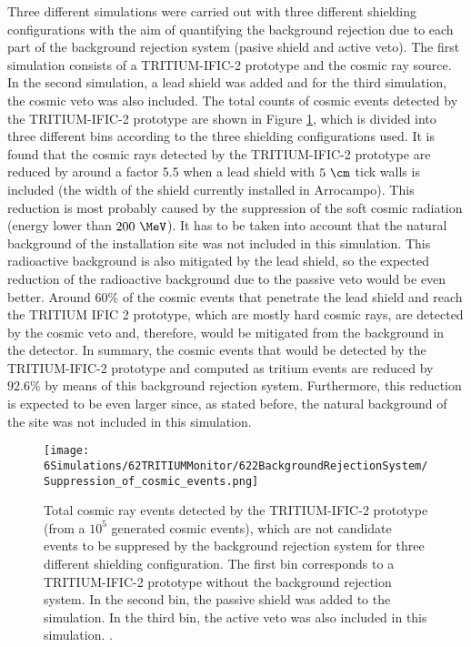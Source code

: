 Three different simulations were carried out with three different shielding configurations with the aim of quantifying the background rejection due to each part of the background rejection system (pasive shield and active veto). The first simulation consists of a TRITIUM-IFIC-2 prototype and the cosmic ray source. In the second simulation, a lead shield was added and for the third simulation, the cosmic veto was also included. The total counts of cosmic events detected by the TRITIUM-IFIC-2 prototype are shown in Figure \ref{fig:CosmicEventsSuppressionSimulated}, which is divided into three different bins according to the three shielding configurations used. It is found that the cosmic rays detected by the TRITIUM-IFIC-2 prototype are reduced by around a factor 5.5 when a lead shield with $5~\cm$ tick walls is included (the width of the shield currently installed in Arrocampo). This reduction is most probably caused by the suppression of the soft cosmic radiation (energy lower than $200~\MeV$). It has to be taken into account that the natural background of the installation site was not included in this simulation. This radioactive background is also mitigated by the lead shield, so the expected reduction of the radioactive background due to the passive veto would be even better. Around $60\%$ of the cosmic events that penetrate the lead shield and reach the TRITIUM IFIC 2 prototype, which are mostly hard cosmic rays, are detected by the cosmic veto and, therefore, would be mitigated from the background in the detector. In summary, the cosmic events that would be detected by the TRITIUM-IFIC-2 prototype and computed as tritium events are reduced by $92.6\%$ by means of this background rejection system. Furthermore, this reduction is expected to be even larger since, as stated before, the natural background of the site was not included in this simulation.

\begin{figure}[h]
\texttt{[image: 6Simulations/62TRITIUMMonitor/622BackgroundRejectionSystem/Suppression\_of\_cosmic\_events.png]}
\centering
\caption{Total cosmic ray events detected by the TRITIUM-IFIC-2 prototype (from a $10^5$ generated cosmic events), which are not candidate events to be suppresed by the background rejection system for three different shielding configuration. The first bin corresponds to a TRITIUM-IFIC-2 prototype without the background rejection system. In the second bin, the passive shield was added to the simulation. In the third bin, the active veto was also included in this simulation.  \label{fig:CosmicEventsSuppressionSimulated}.}
\end{figure}